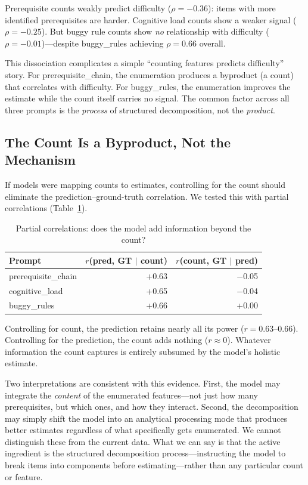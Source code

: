 Prerequisite counts weakly predict difficulty ($\rho = -0.36$): items with more identified prerequisites are harder. Cognitive load counts show a weaker signal ($\rho = -0.25$). But buggy rule counts show \emph{no} relationship with difficulty ($\rho = -0.01$)---despite buggy\_rules achieving $\rho = 0.66$ overall.

This dissociation complicates a simple ``counting features predicts difficulty'' story. For prerequisite\_chain, the enumeration produces a byproduct (a count) that correlates with difficulty. For buggy\_rules, the enumeration improves the estimate while the count itself carries no signal. The common factor across all three prompts is the \emph{process} of structured decomposition, not the \emph{product}.

\subsection{The Count Is a Byproduct, Not the Mechanism}\label{sec:mediation}

If models were mapping counts to estimates, controlling for the count should eliminate the prediction--ground-truth correlation. We tested this with partial correlations (Table~\ref{tab:mediation}).

\begin{table}[t]
\caption{Partial correlations: does the model add information beyond the count?}\label{tab:mediation}
\centering\footnotesize
\begin{tabular}{@{}lrr@{}}
\toprule
Prompt & $r$(pred, GT $|$ count) & $r$(count, GT $|$ pred) \\
\midrule
prerequisite\_chain & +0.63 & $-$0.05 \\
cognitive\_load     & +0.65 & $-$0.04 \\
buggy\_rules        & +0.66 & +0.00 \\
\bottomrule
\end{tabular}
\end{table}

Controlling for count, the prediction retains nearly all its power ($r = 0.63$--$0.66$). Controlling for the prediction, the count adds nothing ($r \approx 0$). Whatever information the count captures is entirely subsumed by the model's holistic estimate.

Two interpretations are consistent with this evidence. First, the model may integrate the \emph{content} of the enumerated features---not just how many prerequisites, but which ones, and how they interact. Second, the decomposition may simply shift the model into an analytical processing mode that produces better estimates regardless of what specifically gets enumerated. We cannot distinguish these from the current data. What we can say is that the active ingredient is the structured decomposition process---instructing the model to break items into components before estimating---rather than any particular count or feature.

